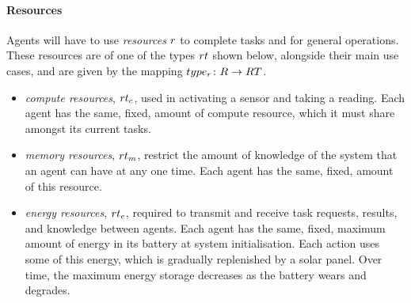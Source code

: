 
\paragraph{Resources}
\label{section:overview:resources}

\newcommand{\varResourceType}[2]{\varSymbol{RT}{#1}{#2}}
\newcommand{\setResourceType}[2]{\setSymbol{RT}{#1}{#2}}
\newcommand{\varResourceTypeCompute}[2]{\varResourceType{c}{#2}}
\newcommand{\varResourceTypeEnergy}[2]{\varResourceType{e}{#2}}
\newcommand{\varResourceTypeMemory}[2]{\varResourceType{m}{#2}}
\newcommand{\varResourceCompute}[2]{\varResource{c}{#2}}
\newcommand{\varResourceEnergy}[2]{\varResource{e}{#2}}
\newcommand{\varResourceMemory}[2]{\varResource{m}{#2}}

\newcommand{\formalResourceType}[2]{
	\functionFormal{type_r}
	{\setResource{}{}}
	{\setResourceType{}{}}
}
\newcommand{\functionResourceType}[2]{
	\functionSignature{type_r}
	{\varResource{}{}}}
Agents will have to use \textit{resources} $\varResource{}{}$ to complete tasks and for general operations. These resources are of one of the types $\varResourceType{}{}$ shown below, alongside their main use cases, and are given by the mapping $\formalResourceType{}{}$.

\begin{itemize}
	\item \textit{compute resources}, $\varResourceTypeCompute{}{}$,  used in activating a sensor and taking a reading. Each agent has the same, fixed, amount of compute resource, which it must share amongst its current tasks.
	
	\item \textit{memory resources}, $\varResourceTypeMemory{}{}$,  restrict the amount of knowledge of the system that an agent can have at any one time. Each agent has the same, fixed, amount of this resource.

	\item \textit{energy resources}, $\varResourceTypeEnergy{}{}$,  required to transmit and receive task requests, results, and knowledge between agents. Each agent has the same, fixed, maximum amount of energy in its battery at system initialisation. Each action uses some of this energy, which is gradually replenished by a solar panel. Over time, the maximum energy storage decreases as the battery wears and degrades.
\end{itemize}

